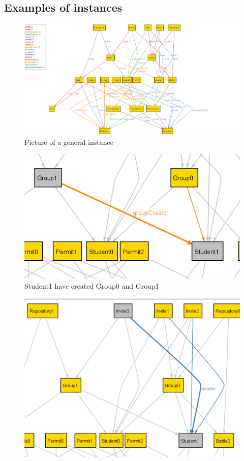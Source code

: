 \documentclass{article}
\begin{document}
{\subsection{Examples of instances}
\begin{figure}[H]
    \centering
    \hspace*{-4.3cm}\includegraphics[scale=0.68]{images/ALLOY/AlloyInstance1.png}
    \caption{Picture of a general instance}
    \label{fig:Picture of a general instance}
\end{figure}
\begin{figure}[H]
    \centering
    \includegraphics{images/ALLOY/groupCreator.png}
    \caption{Student1 have created Group0 and Group1}
    \label{fig:group creation}
\end{figure}
\begin{figure}[H]
    \centering
    \includegraphics{images/ALLOY/sender.png}

\end{figure}}
\end{document}

